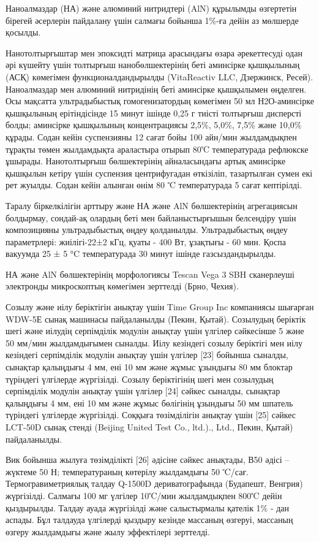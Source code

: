 Наноалмаздар (НА) және алюминий нитридтері (AlN) құрылымды өзгертетін
бірегей әсерлерін пайдалану үшін салмағы бойынша 1\%-ға дейін аз
мөлшерде қосылды.

Нанотолтырғыштар мен эпоксидті матрица арасындағы өзара әрекеттесуді
одан әрі күшейту үшін толтырғыш нанобөлшектерінің беті аминсірке
қышқылының (АСҚ) көмегімен функционалдандырылды (VitaReactiv LLC,
Дзержинск, Ресей). Наноалмаздар мен алюминий нитридінің беті аминсірке
қышқылымен өңделген. Осы мақсатта ультрадыбыстық гомогенизатордың
көмегімен 50 мл Н2О-аминсірке қышқылының ерітіндісінде 15 минут ішінде
0,25 г тиісті толтырғыш дисперсті болды; аминсірке қышқылының
концентрациясы 2,5\%, 5,0\%, 7,5\% және 10,0\% құрады. Содан кейін
суспензияны 12 сағат бойы 100 айн/мин жылдамдықпен тұрақты төмен
жылдамдықта араластыра отырып 80℃ температурада рефлюкске ұшырады.
Нанотолтырғыш бөлшектерінің айналасындағы артық аминсірке қышқылын
кетіру үшін суспензия центрифугадан өткізіліп, тазартылған сумен екі рет
жуылды. Содан кейін алынған өнім 80 ℃ температурада 5 сағат кептірілді.

Таралу біркелкілігін арттыру және НА және AlN бөлшектерінің агрегациясын
болдырмау, сондай-ақ олардың беті мен байланыстырғышын белсендіру үшін
композицияны ультрадыбыстық өңдеу қолданылды. Ультрадыбыстық өңдеу
параметрлері: жиілігі-22±2 кГц, қуаты - 400 Вт, ұзақтығы - 60 мин. Қоспа
вакуумда 25 ± 5 °C температурада 30 минут ішінде газсыздандырылды.

НА және AlN бөлшектерінің морфологиясы Tescan Vega 3 SBH сканерлеуші
электронды микроскоптың көмегімен зерттелді (Брно, Чехия).

Созылу және иілу беріктігін анықтау үшін Time Group Inc компаниясы
шығарған WDW-5Е сынақ машинасы пайдаланылды (Пекин, Қытай). Созылудың
беріктік шегі және иілудің серпімділік модулін анықтау үшін үлгілер
сәйкесінше 5 және 50 мм/мин жылдамдығымен сыналды. Иілу кезіндегі созылу
беріктігі мен иілу кезіндегі серпімділік модулін анықтау үшін үлгілер
{[}23{]} бойынша сыналды, сынақтар қалыңдығы 4 мм, ені 10 мм және жұмыс
ұзындығы 80 мм блоктар түріндегі үлгілерде жүргізілді. Созылу
беріктігінің шегі мен созылудың серпімділік модулін анықтау үшін үлгілер
{[}24{]} сәйкес сыналды, сынақтар қалыңдығы 4 мм, ені 10 мм және жұмыс
бөлігінің ұзындығы 50 мм шпатель түріндегі үлгілерде жүргізілді. Соққыға
төзімділігін анықтау үшін {[}25{]} сәйкес LCT-50D сынақ стенді (Beijing
United Test Co., ltd.)., Ltd., Пекин, Қытай) пайдаланылды.

Вик бойынша жылуға төзімділікті {[}26{]} әдісіне сәйкес анықтады, В50
әдісі -- жүктеме 50 Н; температураның көтерілу жылдамдығы 50 ℃/сағ.
Термогравиметриялық талдау Q-1500D дериватографында (Будапешт, Венгрия)
жүргізілді. Салмағы 100 мг үлгілер 10℃/мин жылдамдықпен 800℃ дейін
қыздырылды. Талдау ауада жүргізілді және салыстырмалы қателік 1\% - дан
аспады. Бұл талдауда үлгілерді қыздыру кезінде массаның өзгеруі,
массаның өзгеру жылдамдығы және жылу эффектілері зерттелді.

